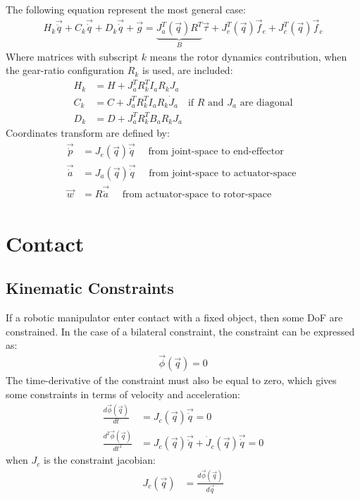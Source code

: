 The following equation represent the most general case:
%
\begin{align}
H_k \vec{\ddot{q}} + C_k \vec{\dot{q}} + D_k \vec{\dot{q}} + \vec{g} =  \underbrace{ J_a^T(\vec{q}) R^T }_B  \vec{\tau} + J_e^T(\vec{q}) \vec{f}_e + J_c^T(\vec{q}) \vec{f}_c
\label{eq:manipulator}
\end{align}
%
Where matrices with subscript $k$ means the rotor dynamics contribution, when the gear-ratio configuration $R_k$ is used, are included:
%
\begin{align}
H_k   &= H + J_a^T R_k^T I_a R_k J_a        \\
C_k   &= C + J_a^T R_k^T I_a R_k \dot{J}_a \quad \text{if $R$ and $J_a$ are diagonal} \\
D_k   &= D + J_a^T R_k^T B_a R_k J_a 
\label{eq:coord_transform}
\end{align}
%
Coordinates transform are defined by:
%
\begin{align}
\vec{\dot{p}}   &= J_e( \vec{q} ) \vec{\dot{q} }  \quad \text{ from joint-space to end-effector   } \\
\vec{\dot{a}}   &= J_a( \vec{q} ) \vec{\dot{q} }  \quad \text{ from joint-space to actuator-space } \\
\vec{w }        &= R              \vec{\dot{a} }  \quad \text{ from actuator-space to rotor-space } 
\label{eq:coord_transform}
\end{align}



\section{Contact}
\label{sec:contact}

\subsection{Kinematic Constraints}
\label{sec:constraints}
%
If a robotic manipulator enter contact with a fixed object, then some DoF are constrained. In the case of a bilateral constraint, the constraint can be expressed as:
\begin{align}
\vec{\phi}( \vec{ q } ) = 0
\label{eq:constraint}
\end{align}
%
The time-derivative of the constraint must also be equal to zero, which gives some constraints in terms of velocity and acceleration:
\begin{align}
\frac{d \vec{\phi}( \vec{ q } ) }{dt}     &= J_c( \vec{ q } ) \vec{\dot{q}}  = 0 \\
\frac{d^2 \vec{\phi}( \vec{ q } ) }{dt^2} &= J_c( \vec{ q } ) \vec{\ddot{q}}  + \dot{J}_c( \vec{ q } ) \vec{\dot{q}} = 0 
\label{eq:constraint_diff}
\end{align}
%
when $J_c$ is the constraint jacobian:
%
\begin{align}
J_c( \vec{ q } )                    &= \frac{d \vec{\phi}( \vec{ q } ) }{d\vec{ q }}
\label{eq:constraint_jaco}
\end{align}

